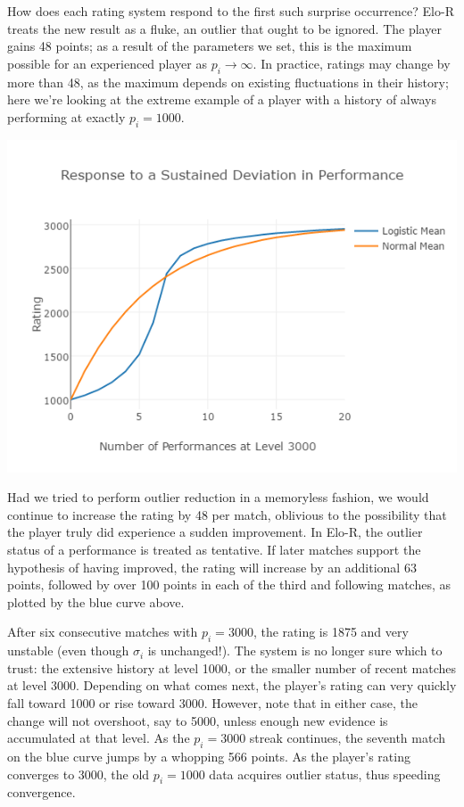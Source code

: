 \documentclass{article}
\begin{document}
How does each rating system respond to the first such surprise occurrence? Elo-R treats the new result as a fluke, an outlier that ought to be ignored. The player gains 48 points; as a result of the parameters we set, this is the maximum possible for an experienced player as $p_i \rightarrow \infty$. In practice, ratings may change by more than 48, as the maximum depends on existing fluctuations in their history; here we're looking at the extreme example of a player with a history of always performing at exactly $p_i = 1000$.

\begin{center} \includegraphics[scale=0.5]{../images/ResponsePlot.png} \end{center}

Had we tried to perform outlier reduction in a memoryless fashion, we would continue to increase the rating by 48 per match, oblivious to the possibility that the player truly did experience a sudden improvement. In Elo-R, the outlier status of a performance is treated as tentative. If later matches support the hypothesis of having improved, the rating will increase by an additional 63 points, followed by over 100 points in each of the third and following matches, as plotted by the blue curve above.

After six consecutive matches with $p_i = 3000$, the rating is 1875 and very unstable (even though $\sigma_i$ is unchanged!). The system is no longer sure which to trust: the extensive history at level 1000, or the smaller number of recent matches at level 3000. Depending on what comes next, the player's rating can very quickly fall toward 1000 or rise toward 3000. However, note that in either case, the change will not overshoot, say to 5000, unless enough new evidence is accumulated at that level. As the $p_i=3000$ streak continues, the seventh match on the blue curve jumps by a whopping 566 points. As the player's rating converges to 3000, the old $p_i = 1000$ data acquires outlier status, thus speeding convergence.
\end{document}
